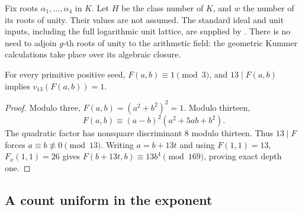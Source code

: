 Fix roots $\alpha_1,\ldots,\alpha_4$ in $K$. Let $H$ be the class
number of $K$, and $w$ the number of its roots of unity. Their values
are not assumed. The standard ideal and unit inputs, including the full
logarithmic unit lattice, are supplied by
\cite[Chapters~3--5, Theorems~5.1 and~5.9]{MilneANT2020}.
There is no need to adjoin $g$-th roots of unity to the arithmetic
field: the geometric Kummer calculations take place over its algebraic
closure.

\begin{lemma}\label{qc-bad-depth}
For every primitive positive seed, $F(a,b)\equiv1\pmod3$, and
$13\mid F(a,b)$ implies $v_{13}(F(a,b))=1$.
\end{lemma}
\begin{proof}
Modulo three, $F(a,b)=(a^2+b^2)^2=1$. Modulo thirteen,
\[
 F(a,b)\equiv(a-b)^2(a^2+5ab+b^2).
\]
The quadratic factor has nonsquare discriminant $8$ modulo thirteen.
Thus $13\mid F$ forces $a\equiv b\not\equiv0\pmod{13}$. Writing
$a=b+13t$ and using $F(1,1)=13$, $F_x(1,1)=26$ gives
$F(b+13t,b)\equiv13b^4\pmod{169}$, proving exact depth one.
\end{proof}

\subsection{A count uniform in the exponent}

